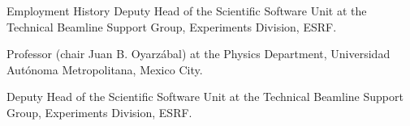 \begin{rubric}{Employment History}
\entry*[2009 –- 2006]  Deputy Head of the Scientific Software Unit at the Technical Beamline Support Group, Experiments Division, ESRF.


\entry*[2005] Professor (chair Juan B. Oyarz\'abal) at the Physics Department, Universidad Aut\'onoma Metropolitana, Mexico City.


\entry*[2000 –- 2004]  Deputy Head of the Scientific Software Unit at the Technical Beamline Support Group, Experiments Division, ESRF.



\end{rubric}
